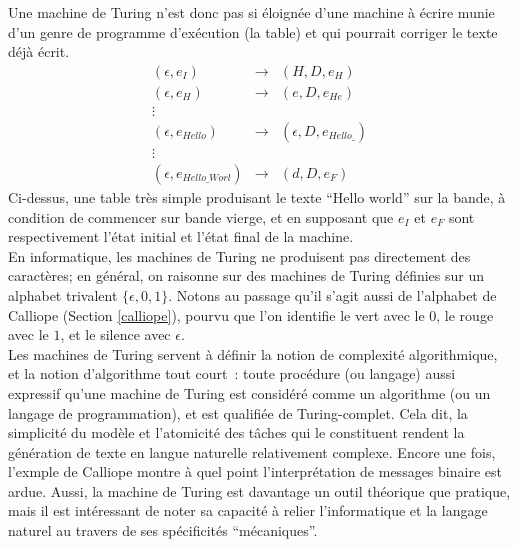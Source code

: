 \documentclass{article}
\begin{document}
				Une machine de Turing n'est donc pas si éloignée d'une machine à écrire munie d'un genre de programme d'exécution (la table) et qui pourrait corriger le texte déjà écrit.  
				\begin{eqnarray*}
				(\epsilon, e_I) &\rightarrow& (H, D, e_H)\\
				(\epsilon, e_H) &\rightarrow& (e, D, e_{He}) \\
				\vdots\\
				(\epsilon, e_{Hello}) &\rightarrow& (\epsilon, D, e_{Hello\_})\\
				\vdots\\
				(\epsilon, e_{Hello\_Worl}) &\rightarrow& (d, D, e_F)
				\end{eqnarray*}
				Ci-dessus, une table très simple produisant le texte ``Hello world'' sur la bande, à condition de commencer sur bande vierge, et en supposant que $e_I$ et $e_F$ sont respectivement l'état initial et l'état final de la machine.\\
				
				En informatique, les machines de Turing ne produisent pas directement des caractères; en général, on raisonne sur des machines de Turing définies sur un alphabet trivalent $\lbrace \epsilon, 0, 1 \rbrace$. Notons au passage qu'il s'agit aussi de l'alphabet de Calliope (Section \ref{calliope}), pourvu que l'on identifie le vert avec le $0$, le rouge avec le $1$, et le silence avec $\epsilon$.\\
				Les machines de Turing servent à définir la notion de complexité algorithmique, et la notion d'algorithme tout court~: toute procédure (ou langage) aussi expressif qu'une machine de Turing est considéré comme un algorithme (ou un langage de programmation), et est qualifiée de Turing-complet. Cela dit, la simplicité du modèle et l'atomicité des tâches qui le constituent rendent la génération de texte en langue naturelle relativement complexe. Encore une fois, l'exmple de Calliope montre à quel point l'interprétation de messages binaire est ardue. Aussi, la machine de Turing est davantage un outil théorique que pratique, mais il est intéressant de noter sa capacité à relier l'informatique et la langage naturel au travers de ses spécificités ``mécaniques''.\\
				
\end{document}
